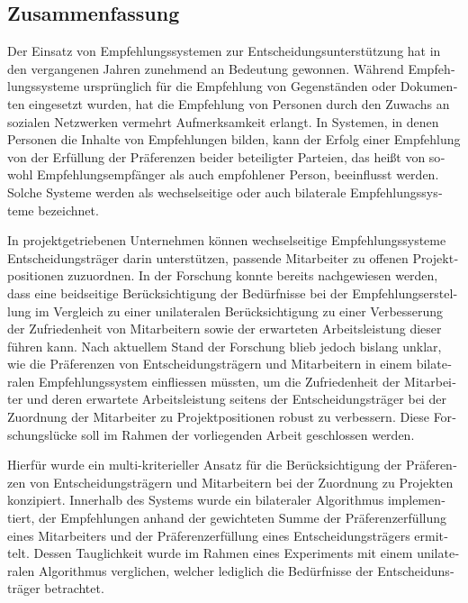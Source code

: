 \begin{otherlanguage}{ngerman}
\chapter*{Zusammenfassung}
Der Einsatz von Empfehlungssystemen zur Entscheidungsunterstützung hat in den vergangenen Jahren zunehmend an Bedeutung gewonnen.
Während Empfehlungssysteme ursprünglich für die Empfehlung von Gegenständen oder Dokumenten eingesetzt wurden, hat die Empfehlung von Personen durch den Zuwachs an sozialen Netzwerken vermehrt Aufmerksamkeit erlangt.
In Systemen, in denen Personen die Inhalte von Empfehlungen bilden, kann der Erfolg einer Empfehlung von der Erfüllung der Präferenzen beider beteiligter Parteien, das heißt von sowohl Empfehlungsempfänger als auch empfohlener Person, beeinflusst werden.
Solche Systeme werden als wechselseitige oder auch bilaterale Empfehlungssysteme bezeichnet.

In projektgetriebenen Unternehmen können wechselseitige Empfehlungssysteme Entscheidungsträger darin unterstützen, passende Mitarbeiter zu offenen Projektpositionen zuzuordnen.
In der Forschung konnte bereits nachgewiesen werden, dass eine beidseitige Berücksichtigung der Bedürfnisse bei der Empfehlungserstellung im Vergleich zu einer unilateralen Berücksichtigung zu einer Verbesserung der Zufriedenheit von Mitarbeitern sowie der erwarteten Arbeitsleistung dieser führen kann.
Nach aktuellem Stand der Forschung blieb jedoch bislang unklar, wie die Präferenzen von Entscheidungsträgern und Mitarbeitern in einem bilateralen Empfehlungssystem einfliessen müssten, um die Zufriedenheit der Mitarbeiter und deren erwartete Arbeitsleistung seitens der Entscheidungsträger bei der Zuordnung der Mitarbeiter zu Projektpositionen robust zu verbessern.
Diese Forschungslücke soll im Rahmen der vorliegenden Arbeit geschlossen werden.

Hierfür wurde ein multi-kriterieller Ansatz für die Berücksichtigung der Präferenzen von Entscheidungsträgern und Mitarbeitern bei der Zuordnung zu Projekten konzipiert.
Innerhalb des Systems wurde ein bilateraler Algorithmus implementiert, der Empfehlungen anhand der gewichteten Summe der Präferenzerfüllung eines Mitarbeiters und der Präferenzerfüllung eines Entscheidungsträgers ermittelt.
Dessen Tauglichkeit wurde im Rahmen eines Experiments mit einem unilateralen Algorithmus verglichen, welcher lediglich die Bedürfnisse der Entscheidunsträger betrachtet.


\end{otherlanguage}
